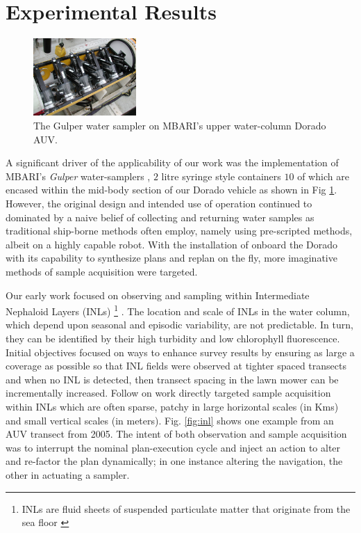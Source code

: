 \section{Experimental Results}
\label{sec:results}



\begin{figure}[htpb]
\centering
\includegraphics[width=0.35\textwidth]{figs/gulper.jpg}
\caption{\small{The Gulper water sampler \cite{Bird07} on MBARI's
    upper water-column Dorado AUV.}}
\label{fig:gulper}
\end{figure}

A significant driver of the applicability of our work was the
implementation of MBARI's \emph{Gulper} water-samplers \cite{Bird07},
$2$ litre syringe style containers $10$ of which are encased within
the mid-body section of our Dorado vehicle as shown in Fig
\ref{fig:gulper}. However, the original design and intended use of
operation continued to dominated by a naive belief of collecting and
returning water samples as traditional ship-borne methods often
employ, namely using pre-scripted methods, albeit on a highly capable
robot. With the installation of \rx onboard the Dorado with its
capability to synthesize plans and replan on the fly, more imaginative
methods of sample acquisition were targeted.

Our early work focused on observing and sampling within Intermediate
Nephaloid Layers (INLs) \footnote{INLs are fluid sheets of suspended
  particulate matter that originate from the sea floor
  \cite{mcphee-shaw2006}} \cite{ryan10}. The location and scale of
INLs in the water column, which depend upon seasonal and episodic
variability, are not predictable. In turn, they can be identified by
their high turbidity and low chlorophyll fluorescence. Initial
objectives focused on ways to enhance survey results by ensuring as
large a coverage as possible so that INL fields were observed at
tighter spaced transects and when no INL is detected, then transect
spacing in the lawn mower can be incrementally increased. Follow on
work directly targeted sample acquisition within INLs which are often
sparse, patchy in large horizontal scales (in Kms) and small vertical
scales (in meters). Fig. \ref{fig:inl} shows one example from an AUV
transect from 2005. The intent of both observation and sample
acquisition was to interrupt the nominal plan-execution cycle and
inject an action to alter and re-factor the plan dynamically; in one
instance altering the navigation, the other in actuating a sampler.

